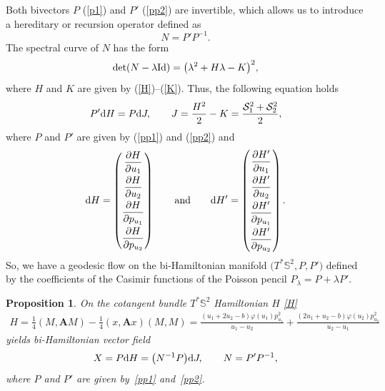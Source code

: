\documentclass[pdftex]{sigma}
\numberwithin{equation}{section}
\newtheorem{Proposition}[Theorem]{Proposition}
 { \theoremstyle{definition}
\newtheorem{Definition}[Theorem]{Definition}
\newtheorem{Note}[Theorem]{Note}
\newtheorem{Example}[Theorem]{Example}
\newtheorem{Remark}[Theorem]{Remark} }
\begin{document}
Both bivectors $P$ (\ref{p1}) and $P'$ (\ref{pp2}) are invertible, which allows us to introduce a hereditary or recursion operator defined as
\[N=P' P^{-1} .\]
The spectral curve of $N$ has the form
\[
\det(N-\lambda {\rm Id})=\big(\lambda^2+H\lambda-K\big)^2 ,
\]
where $H$ and $K$ are given by (\ref{H})--(\ref{K}). Thus, the following equation holds
\begin{equation*}%
P'{\rm d}H=P{\rm d}J ,\qquad J=\frac{H^2}{2}-K=\frac{\mathcal{S}_1^2+\mathcal{S}_2^2}{2},
\end{equation*}
 where $P$ and $P'$ are given by (\ref{pp1}) and (\ref{pp2}) and
\[
{\rm d}H=\left(
 \begin{matrix}
 \dfrac{\partial H}{\partial u_1} \vspace{1mm}\\
 \dfrac{\partial H}{\partial u_2} \vspace{1mm}\\
 \dfrac{\partial H}{\partial p_{u_1}} \vspace{1mm}\\
 \dfrac{\partial H}{\partial p_{u_2}}
 \end{matrix}
 \right)\qquad\mbox{and}\qquad
{\rm d}H'=\left(
 \begin{matrix}
 \dfrac{\partial H'}{\partial u_1} \vspace{1mm}\\
 \dfrac{\partial H'}{\partial u_2} \vspace{1mm}\\
 \dfrac{\partial H'}{\partial p_{u_1}} \vspace{1mm}\\
 \dfrac{\partial H'}{\partial p_{u_2}}
 \end{matrix}
 \right) .
\]
So, we have a geodesic flow on the bi-Hamiltonian manifold $\big(T^*\mathbb S^2, P, P'\big)$ defined by the coefficients of the Casimir functions of the Poisson pencil $P_\lambda=P+\lambda P'$.
\begin{Proposition}
On the cotangent bundle $T^*\mathbb S^2$ Hamiltonian $H$ \eqref{H}
\begin{gather*}
H=\frac{1}{4}(M,\mathbf AM)-\frac{1}{4}(x,\mathbf Ax)(M,M)
=\frac{(u_1+2u_2-b)\varphi(u_1)p_{u_1}^2}{u_1-u_2}+\frac{( 2u_1 + u_2-b)\varphi(u_2)p_{u_2}^2}{u_2 - u_1}
\end{gather*}
yields bi-Hamiltonian vector field
\[
X=P{\rm d}H=\bigl(N^{-1}P\bigr) {\rm d}J , \qquad N=P' P^{-1},
\]
where $P$ and $P'$ are given by~\eqref{pp1} and~\eqref{pp2}.
\end{Proposition}
\end{document}
